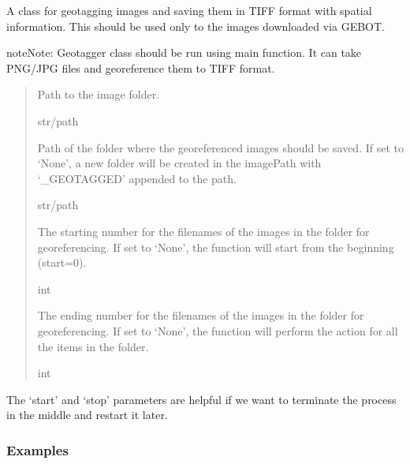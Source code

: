 \documentclass[letterpaper,10pt,english]{sphinxmanual}
\begin{document}
\sphinxAtStartPar
A class for geotagging images and saving them in TIFF format with spatial information. This should be used only to the images downloaded via GEBOT.

\begin{sphinxadmonition}{note}{Note:}
\sphinxAtStartPar
Geotagger class should be run using main function. It can take PNG/JPG files and georeference them to TIFF format.
\end{sphinxadmonition}
\begin{quote}\begin{description}
\sphinxAtStartPar
Path to the image folder.

\sphinxAtStartPar
str/path

\sphinxAtStartPar
Path of the folder where the georeferenced images should be saved. If set to ‘None’, a new folder will be created in the imagePath with ‘\_GEOTAGGED’ appended to the path.

\sphinxAtStartPar
str/path

\sphinxAtStartPar
The starting number for the filenames of the images in the folder for georeferencing. If set to ‘None’, the function will start from the beginning (start=0).

\sphinxAtStartPar
int

\sphinxAtStartPar
The ending number for the filenames of the images in the folder for georeferencing. If set to ‘None’, the function will perform the action for all the items in the folder.

\sphinxAtStartPar
int

\end{description}\end{quote}

\sphinxAtStartPar
The ‘start’ and ‘stop’ parameters are helpful if we want to terminate the process in the middle and restart it later.
\subsubsection*{Examples}

\begin{sphinxVerbatim}[commandchars=\\\{\}]
         
\end{sphinxVerbatim}
\end{document}
